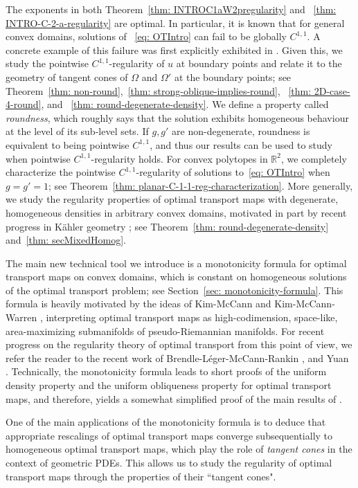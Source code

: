 \documentclass[12pt,reqno]{amsart}
\numberwithin{equation}{section}
\begin{document}
The exponents in both Theorem~\ref{thm: INTROC1aW2pregularity} and ~\ref{thm: INTRO-C-2-a-regularity} are optimal. In particular, it is known that for general convex domains, solutions of ~\eqref{eq: OTIntro} can fail to be globally $C^{1, 1}$. A concrete example of this failure was first explicitly exhibited in \cite{JMPS}. Given this, we study the pointwise $C^{1, 1}$-regularity of $u$ at boundary points and relate it to the geometry of tangent cones of $\Omega$ and $\Omega'$ at the boundary points; see Theorem~\ref{thm: non-round},~\ref{thm: strong-oblique-implies-round}, ~\ref{thm: 2D-case-4-round}, and ~\ref{thm: round-degenerate-density}. We define a property called {\em roundness}, which roughly says that the solution exhibits homogeneous behaviour at the level of its sub-level sets. If $g, g'$ are non-degenerate, roundness is equivalent to being pointwise $C^{1, 1}$, and thus our results can be used to study when pointwise $C^{1, 1}$-regularity holds. For convex polytopes in $\mathbb{R}^2$, we completely characterize the pointwise $C^{1,1}$-regularity of solutions to~\eqref{eq: OTIntro} when $g=g'=1$; see Theorem~\ref{thm: planar-C-1-1-reg-characterization}. More generally, we study the regularity properties of optimal transport maps with degenerate, homogeneous densities in arbitrary convex domains, motivated in part by recent progress in K\"ahler geometry \cite{Collins-Li, Collins-Tong-Yau, Li-intermediate}; see Theorem~\ref{thm: round-degenerate-density} and~\ref{thm: secMixedHomog}.

The main new technical tool we introduce is a monotonicity formula for optimal transport maps on convex domains, which is constant on homogeneous solutions of the optimal transport problem; see Section~\ref{sec: monotonicity-formula}. This formula is heavily motivated by the ideas of Kim-McCann \cite{Kim-McCann} and Kim-McCann-Warren \cite{Kim-McCann-Warren}, interpreting optimal transport maps as high-codimension, space-like, area-maximizing submanifolds of pseudo-Riemannian manifolds. For recent progress on the regularity theory of optimal transport from this point of view, we refer the reader to the recent work of  Brendle-L\'eger-McCann-Rankin \cite{BLMR}, and Yuan \cite{Yuan}.  Technically, the monotonicity formula leads to short proofs of the uniform density property and the uniform obliqueness property for optimal transport maps, and therefore, yields a somewhat simplified proof of the main results of \cite{Caffarelli3, Chen-Liu-Wang}. 

One of the main applications of the monotonicity formula is to deduce that appropriate rescalings of optimal transport maps converge subsequentially to homogeneous optimal transport maps, which play the role of {\em tangent cones} in the context of geometric PDEs.  This allows us to study the regularity of optimal transport maps through the properties of their ``tangent cones". 
\end{document}
